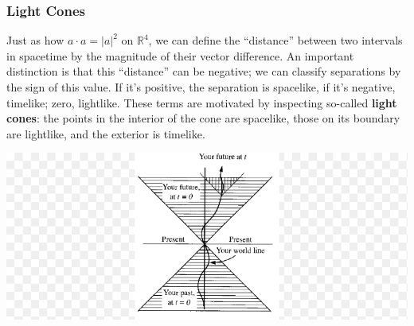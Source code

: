 \documentclass[10pt]{beamer}
\begin{document}
\begin{frame}
  \frametitle{Light Cones}
  Just as how $a\cdot a = |a|^{2}$ on $\mathbb{R}^{4}$, we can define the ``distance'' between two intervals in spacetime by the magnitude of their vector difference.
  An important distinction is that this ``distance'' can be negative; we can classify separations by the sign of this value.
  If it's positive, the separation is spacelike, if it's negative, timelike; zero, lightlike.
  These terms are motivated by inspecting so-called \textbf{light cones}: the points in the interior of the cone are spacelike, those on its boundary are lightlike, and the exterior is timelike.
  \begin{center}
    \includegraphics[scale=0.35]{lightcone.png}
  \end{center}
\end{frame}
\end{document}
